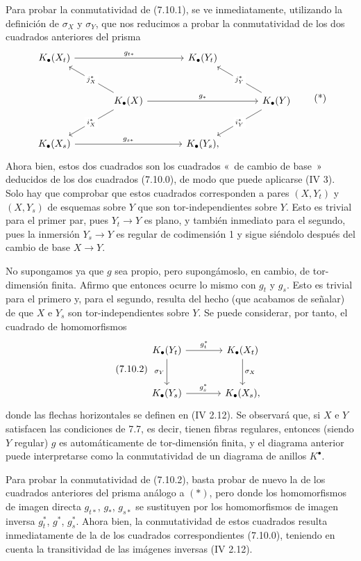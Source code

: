 Para probar la conmutatividad de (7.10.1), se ve inmediatamente, utilizando la definición de \(\sigma_X\) y \(\sigma_Y\), que nos reducimos a probar la conmutatividad de los dos cuadrados anteriores del prisma
\[
\begin{tikzcd}[column sep=large,row sep=large]
K_\bullet(X_t) \arrow[rr,"g_{t*}"] && K_\bullet(Y_t)\\
& K_\bullet(X) \arrow[ul,"j_X^*" description] \arrow[dl,"i_X^*" description] \arrow[rr,"g_*"] &&
K_\bullet(Y) \arrow[ul,"j_Y^*" description] \arrow[dl,"i_Y^*" description]\\
K_\bullet(X_s) \arrow[rr,"g_{s*}"] && K_\bullet(Y_s),
\end{tikzcd}
\tag{*}
\]
Ahora bien, estos dos cuadrados son los cuadrados «~de cambio de base~» deducidos de los dos cuadrados (7.10.0), de modo que puede aplicarse (IV 3). Solo hay que comprobar que estos cuadrados corresponden a pares \((X,Y_t)\) y \((X,Y_s)\) de esquemas sobre \(Y\) que son tor-independientes sobre \(Y\). Esto es trivial para el primer par, pues \(Y_t\to Y\) es plano, y también inmediato para el segundo, pues la inmersión \(Y_s\to Y\) es regular de codimensión 1 y sigue siéndolo después del cambio de base \(X\to Y\).

No supongamos ya que \(g\) sea propio, pero supongámoslo, en cambio, de tor-dimensión finita. Afirmo que entonces ocurre lo mismo con \(g_t\) y \(g_s\). Esto es trivial para el primero y, para el segundo, resulta del hecho (que acabamos de señalar) de que \(X\) e \(Y_s\) son tor-independientes sobre \(Y\). Se puede considerar, por tanto, el cuadrado de homomorfismos
\begin{equation}\tag{7.10.2}
\begin{tikzcd}[column sep=large,row sep=large]
K_\bullet(Y_t) \arrow[r,"g_t^*"] \arrow[d,"\sigma_Y"'] &
K_\bullet(X_t) \arrow[d,"\sigma_X"]\\
K_\bullet(Y_s) \arrow[r,"g_s^*"] &
K_\bullet(X_s),
\end{tikzcd}
\end{equation}
donde las flechas horizontales se definen en (IV 2.12). Se observará que, si \(X\) e \(Y\) satisfacen las condiciones de 7.7, es decir, tienen fibras regulares, entonces (siendo \(Y\) regular) \(g\) es automáticamente de tor-dimensión finita, y el diagrama anterior puede interpretarse como la conmutatividad de un diagrama de anillos \(K^\bullet\).

Para probar la conmutatividad de (7.10.2), basta probar de nuevo la de los cuadrados anteriores del prisma análogo a \((*)\), pero donde los homomorfismos de imagen directa \(g_{t*}\), \(g_*\), \(g_{s*}\) se sustituyen por los homomorfismos de imagen inversa \(g_t^*\), \(g^*\), \(g_s^*\). Ahora bien, la conmutatividad de estos cuadrados resulta inmediatamente de la de los cuadrados correspondientes (7.10.0), teniendo en cuenta la transitividad de las imágenes inversas (IV 2.12).

